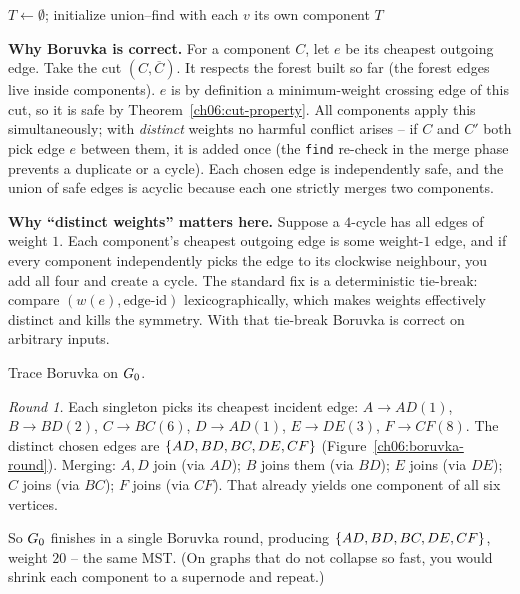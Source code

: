 \begin{algorithm}[H]
\caption{Boruvka-MST}
\label{ch06:boruvka}
$T\gets\emptyset$; initialize union--find with each $v$ its own component\;
\Return $T$\;
\end{algorithm}

\begin{whybox}
\textbf{Why Boruvka is correct.} For a component $C$, let $e$ be its cheapest outgoing edge. Take the cut $(C,\overline C)$. It respects the forest built so far (the forest edges live inside components). $e$ is by definition a minimum-weight crossing edge of this cut, so it is safe by Theorem~\ref{ch06:cut-property}. All components apply this simultaneously; with \emph{distinct} weights no harmful conflict arises -- if $C$ and $C'$ both pick edge $e$ between them, it is added once (the \texttt{find} re-check in the merge phase prevents a duplicate or a cycle). Each chosen edge is independently safe, and the union of safe edges is acyclic because each one strictly merges two components.
\end{whybox}

\begin{trapbox}
\textbf{Why ``distinct weights'' matters here.} Suppose a $4$-cycle has all edges of weight $1$. Each component's cheapest outgoing edge is some weight-$1$ edge, and if every component independently picks the edge to its clockwise neighbour, you add all four and create a cycle. The standard fix is a deterministic tie-break: compare $(w(e),\text{edge-id})$ lexicographically, which makes weights effectively distinct and kills the symmetry. With that tie-break Boruvka is correct on arbitrary inputs.
\end{trapbox}

\begin{labbox}
Trace Boruvka on $G_0$.

\emph{Round 1.} Each singleton picks its cheapest incident edge:
$A\!\to\!AD(1)$, $B\!\to\!BD(2)$, $C\!\to\!BC(6)$, $D\!\to\!AD(1)$, $E\!\to\!DE(3)$, $F\!\to\!CF(8)$.
The distinct chosen edges are $\{AD,BD,BC,DE,CF\}$ (Figure~\ref{ch06:boruvka-round}). Merging: $A,D$ join (via $AD$); $B$ joins them (via $BD$); $E$ joins (via $DE$); $C$ joins (via $BC$); $F$ joins (via $CF$). That already yields one component of all six vertices.

So $G_0$ finishes in a single Boruvka round, producing $\{AD,BD,BC,DE,CF\}$, weight $20$ -- the same MST. (On graphs that do not collapse so fast, you would shrink each component to a supernode and repeat.)
\end{labbox}

